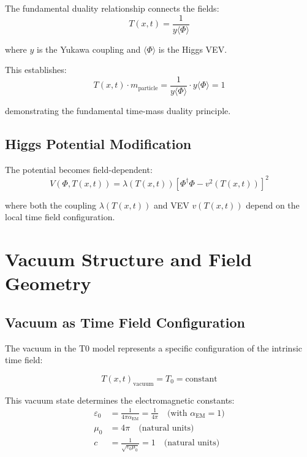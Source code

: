 \documentclass[12pt,a4paper]{article}
\newcommand{\Tfieldt}{T(x,t)}
\newcommand{\Tzero}{T_0}
\begin{document}
	The fundamental duality relationship connects the fields:
	\begin{equation}
		\Tfieldt = \frac{1}{y\langle\Phi\rangle}
		\label{eq:time_higgs_duality}
	\end{equation}
	
	where $y$ is the Yukawa coupling and $\langle\Phi\rangle$ is the Higgs VEV.
	
	This establishes:
	\begin{equation}
		\Tfieldt \cdot m_{\text{particle}} = \frac{1}{y\langle\Phi\rangle} \cdot y\langle\Phi\rangle = 1
		\label{eq:time_mass_unity}
	\end{equation}
	
	demonstrating the fundamental time-mass duality principle.
	
	\subsection{Higgs Potential Modification}
	\label{subsec:higgs_potential_modification}
	
	The potential becomes field-dependent:
	\begin{equation}
		V(\Phi, \Tfieldt) = \lambda(\Tfieldt)[\Phi^{\dagger}\Phi - v^2(\Tfieldt)]^2
		\label{eq:modified_higgs_potential}
	\end{equation}
	
	where both the coupling $\lambda(\Tfieldt)$ and VEV $v(\Tfieldt)$ depend on the local time field configuration.
	
	\section{Vacuum Structure and Field Geometry}
	\label{sec:vacuum_structure}
	
	\subsection{Vacuum as Time Field Configuration}
	\label{subsec:vacuum_time_field}
	
	The vacuum in the T0 model represents a specific configuration of the intrinsic time field:
	
	\begin{equation}
		\Tfieldt_{\text{vacuum}} = \Tzero = \text{constant}
		\label{eq:vacuum_time_field}
	\end{equation}
	
	This vacuum state determines the electromagnetic constants:
	\begin{align}
		\varepsilon_0 &= \frac{1}{4\pi\alpha_{\text{EM}}} = \frac{1}{4\pi} \quad \text{(with } \alpha_{\text{EM}} = 1\text{)} \\
		\mu_0 &= 4\pi \quad \text{(natural units)} \\
		c &= \frac{1}{\sqrt{\varepsilon_0\mu_0}} = 1 \quad \text{(natural units)}
		\label{eq:vacuum_constants}
	\end{align}
	
\end{document}
